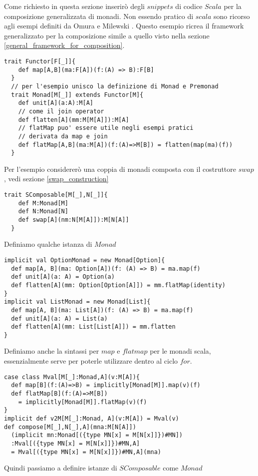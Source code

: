 \label{scala_code}
Come richiesto in questa sezione inserirò degli $snippets$ di codice $Scala$
per la composizione generalizzata di monadi.
Non essendo pratico di $scala$ sono ricorso agli esempi definiti da Omura \cite{omura0}
e Milewski \cite{milewski0}.
Questo esempio ricrea il framework generalizzato per la composizione simile a quello
visto nella sezione \ref{general_framework_for_composition}.

\begin{lstlisting}[style=myScalastyle, caption=Functor and Monad Traits]
  trait Functor[F[_]]{
    def map[A,B](ma:F[A])(f:(A) => B):F[B]
  }
  // per l'esempio unisco la definizione di Monad e Premonad
  trait Monad[M[_]] extends Functor[M]{
    def unit[A](a:A):M[A]
    // come il join operator
    def flatten[A](mm:M[M[A]]):M[A]
    // flatMap puo' essere utile negli esempi pratici
    // derivata da map e join
    def flatMap[A,B](ma:M[A])(f:(A)=>M[B]) = flatten(map(ma)(f))
  }
\end{lstlisting}

Per l'esempio considererò una coppia di monadi composta con il costruttore $swap$,
vedi sezione \ref{swap_construction}

\begin{lstlisting}[style=myScalastyle, caption=Swap Constructor]
  trait SComposable[M[_],N[_]]{
    def M:Monad[M]
    def N:Monad[N]
    def swap[A](nm:N[M[A]]):M[N[A]]
  }
\end{lstlisting}

Definiamo qualche istanza di $Monad$

\begin{lstlisting}[style=myScalastyle, caption=Type class instances]
implicit val OptionMonad = new Monad[Option]{
  def map[A, B](ma: Option[A])(f: (A) => B) = ma.map(f)
  def unit[A](a: A) = Option(a)
  def flatten[A](mm: Option[Option[A]]) = mm.flatMap(identity)
}
implicit val ListMonad = new Monad[List]{
  def map[A, B](ma: List[A])(f: (A) => B) = ma.map(f)
  def unit[A](a: A) = List(a)
  def flatten[A](mm: List[List[A]]) = mm.flatten
}
\end{lstlisting}
\pagebreak
Definiamo anche la sintassi per $map$ e $flatmap$ per le monadi scala, essenzialmente
serve per poterle utilizzare dentro al ciclo $for$.
\begin{lstlisting}[style=myScalastyle, caption=Composer]
case class Mval[M[_]:Monad,A](v:M[A]){
  def map[B](f:(A)=>B) = implicitly[Monad[M]].map(v)(f)
  def flatMap[B](f:(A)=>M[B])
    = implicitly[Monad[M]].flatMap(v)(f)
}
implicit def v2M[M[_]:Monad, A](v:M[A]) = Mval(v)
def compose[M[_],N[_],A](mna:M[N[A]])
  (implicit mn:Monad[({type MN[x] = M[N[x]]})#MN])
  :Mval[({type MN[x] = M[N[x]]})#MN,A]
  = Mval[({type MN[x] = M[N[x]]})#MN,A](mna)
\end{lstlisting}
Quindi passiamo a definire istanze di $SComposable$ come $Monad$

